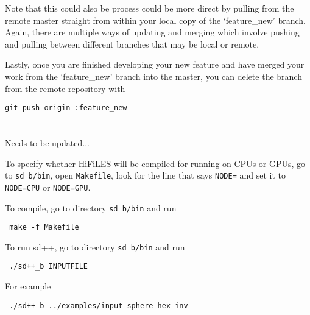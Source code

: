 \documentclass[letter,10pt]{article}
\newcommand*{\TitleFont}{%
      \usefont{\encodingdefault}{\rmdefault}{b}{n}%
      \fontsize{10}{20}%
      \selectfont}
\begin{document}
Note that this could also be process could be more direct by pulling from the remote master straight from within your local copy of the `feature\_new' branch. Again, there are multiple ways of updating and merging which involve pushing and pulling between different branches that may be local or remote.

Lastly, once you are finished developing your new feature and have merged your work from the `feature\_new' branch into the master, you can delete the branch from the remote repository with
\begin{verbatim}
git push origin :feature_new
\end{verbatim}



\section*{\TitleFont{Compiling and running HiFiLES}}

Needs to be updated...

To specify whether HiFiLES will be compiled for running on CPUs or GPUs, go to \texttt{sd\_b/bin}, open
\texttt{Makefile}, look for the line that says \texttt{NODE=} and set it to \texttt{NODE=CPU} or
\texttt{NODE=GPU}.

To compile, go to directory \texttt{sd\_b/bin} and run
\begin{verbatim}
 make -f Makefile
\end{verbatim}
To run sd++, go to directory \texttt{sd\_b/bin} and run
\begin{verbatim}
 ./sd++_b INPUTFILE
\end{verbatim}
For example
\begin{verbatim}
 ./sd++_b ../examples/input_sphere_hex_inv
\end{verbatim}

\section*{\TitleFont{Some nomenclature}}
\end{document}
